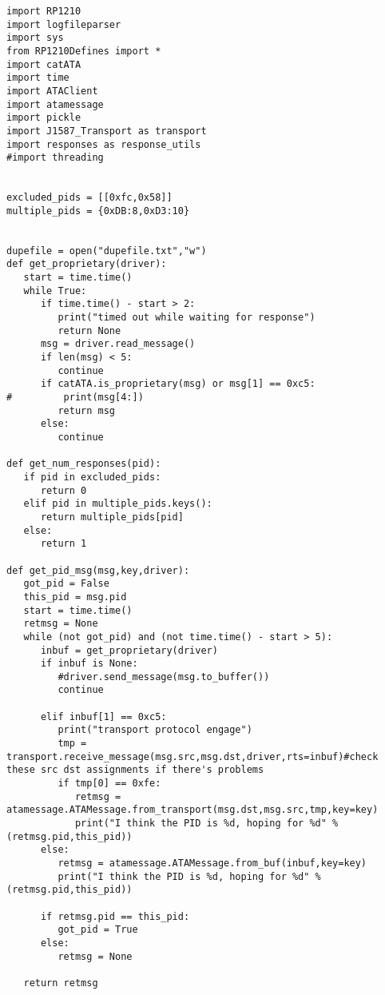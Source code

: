 \label{app:code}


\label{app:extraction}
%
\begin{verbatim}
import RP1210
import logfileparser
import sys
from RP1210Defines import *
import catATA
import time
import ATAClient
import atamessage
import pickle
import J1587_Transport as transport
import responses as response_utils
#import threading


excluded_pids = [[0xfc,0x58]]
multiple_pids = {0xDB:8,0xD3:10}


dupefile = open("dupefile.txt","w")
def get_proprietary(driver):
   start = time.time()
   while True:
      if time.time() - start > 2:
         print("timed out while waiting for response")
         return None
      msg = driver.read_message()
      if len(msg) < 5:
         continue
      if catATA.is_proprietary(msg) or msg[1] == 0xc5:
#         print(msg[4:])
         return msg
      else:
         continue

def get_num_responses(pid):
   if pid in excluded_pids:
      return 0
   elif pid in multiple_pids.keys():
      return multiple_pids[pid]
   else:
      return 1

def get_pid_msg(msg,key,driver):
   got_pid = False
   this_pid = msg.pid
   start = time.time()
   retmsg = None
   while (not got_pid) and (not time.time() - start > 5):
      inbuf = get_proprietary(driver)
      if inbuf is None:
         #driver.send_message(msg.to_buffer())
         continue

      elif inbuf[1] == 0xc5:
         print("transport protocol engage")
         tmp = transport.receive_message(msg.src,msg.dst,driver,rts=inbuf)#check these src dst assignments if there's problems
         if tmp[0] == 0xfe:
            retmsg = atamessage.ATAMessage.from_transport(msg.dst,msg.src,tmp,key=key)
            print("I think the PID is %d, hoping for %d" % (retmsg.pid,this_pid))
      else:
         retmsg = atamessage.ATAMessage.from_buf(inbuf,key=key)
         print("I think the PID is %d, hoping for %d" % (retmsg.pid,this_pid))

      if retmsg.pid == this_pid:
         got_pid = True
      else:
         retmsg = None

   return retmsg




\end{verbatim}
